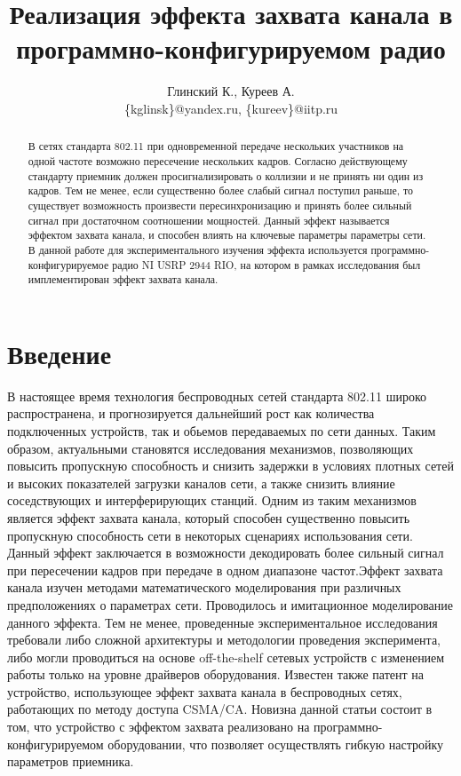 \documentclass{llncs}
\title{Реализация эффекта захвата канала в программно-конфигурируемом радио}
\author{
Глинский К., Куреев А. \\
\{kglinsk\}@yandex.ru, \{kureev\}@iitp.ru\\
}
\institute{ИППИ РАН}
\begin{document}
\maketitle

\begin{abstract}
В сетях стандарта 802.11 при одновременной передаче нескольких участников на одной частоте возможно пересечение нескольких кадров. Согласно действующему стандарту приемник должен просигнализировать о коллизии и не принять ни один из кадров. Тем не менее, если существенно более слабый сигнал поступил раньше, то существует  возможность произвести пересинхронизацию и принять более сильный сигнал при достаточном соотношении мощностей. Данный эффект называется эффектом захвата канала, и способен влиять на ключевые параметры параметры сети. В данной работе для экспериментального изучения эффекта используется  программно-конфигурируемое радио NI USRP 2944 RIO, на котором в рамках  исследования  был имплементирован эффект захвата канала.
\end{abstract}


\section{Введение}
В настоящее время технология беспроводных сетей стандарта 802.11 широко распространена\cite{cisco2017}, и прогнозируется дальнейший рост как количества подключенных устройств, так и обьемов передаваемых по сети данных. Таким образом, актуальными становятся исследования механизмов, позволяющих повысить пропускную способность и снизить задержки в условиях плотных сетей и высоких показателей загрузки каналов сети, а также снизить влияние соседствующих и интерферирующих станций. Одним из таким механизмов является эффект захвата канала, который способен существенно повысить пропускную способность сети в некоторых сценариях использования сети\cite{Kureev2017}. Данный эффект заключается в возможности декодировать более сильный сигнал при пересечении кадров при передаче в одном диапазоне частот.Эффект захвата канала изучен методами математического моделирования при различных предположениях о параметрах сети\cite{Patras2012}. Проводилось и имитационное моделирование данного эффекта. Тем не менее, проведенные  экспериментальное исследования требовали либо сложной архитектуры и методологии проведения эксперимента\cite{Lee2007}, либо могли проводиться на основе off-the-shelf сетевых устройств с изменением работы  только на уровне драйверов оборудования\cite{Kureev2017}. Известен также патент\cite{Boer1997} на устройство, использующее эффект захвата канала в беспроводных сетях, работающих по методу доступа CSMA/CA. Новизна данной статьи состоит в том, что устройство с эффектом захвата реализовано на программно-конфигурируемом оборудовании, что позволяет осуществлять гибкую настройку параметров приемника.
\end{document}
